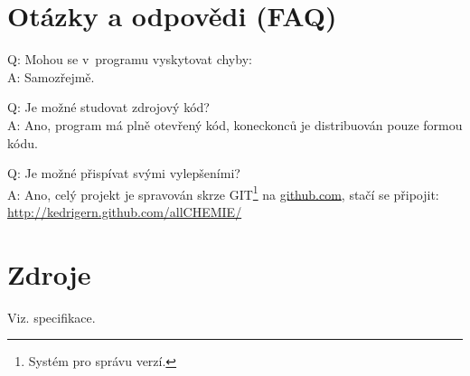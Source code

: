 \documentclass[a4paper]{article}
\begin{document}
\section{Otázky a odpovědi (FAQ)}
Q: Mohou se v~programu vyskytovat chyby:\\
A: Samozřejmě.

\medskip

Q: Je možné studovat zdrojový kód?\\
A: Ano, program má plně otevřený kód, koneckonců je distribuován pouze formou kódu.

\medskip

Q: Je možné přispívat svými vylepšeními?\\
A: Ano, celý projekt je spravován skrze GIT\footnote{Systém pro správu verzí.} na \href{github.com}{github.com}, stačí se připojit:
\href{http://kedrigern.github.com/allCHEMIE/}{http://kedrigern.github.com/allCHEMIE/}
\section{Zdroje}
Viz. specifikace.
\end{document}
